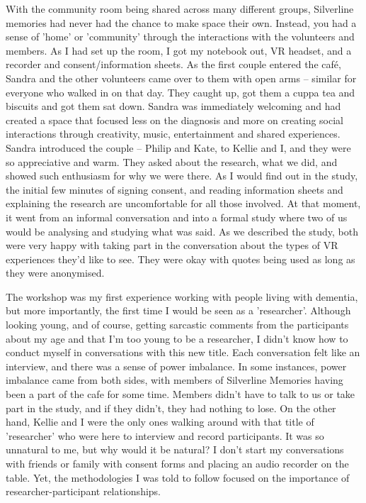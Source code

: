  With the community room being shared across many different groups, Silverline memories had never had the chance to make space their own. Instead, you had a sense of 'home' or 'community' through the interactions with the volunteers and members. As I had set up the room, I got my notebook out, VR headset, and a recorder and consent/information sheets. As the first couple entered the café, Sandra and the other volunteers came over to them with open arms – similar for everyone who walked in on that day. They caught up, got them a cuppa tea and biscuits and got them sat down. Sandra was immediately welcoming and had created a space that focused less on the diagnosis and more on creating social interactions through creativity, music, entertainment and shared experiences. Sandra introduced the couple – Philip and Kate, to Kellie and I, and they were so appreciative and warm. They asked about the research, what we did, and showed such enthusiasm for why we were there. As I would find out in the study, the initial few minutes of signing consent, and reading information sheets and explaining the research are uncomfortable for all those involved. At that moment, it went from an informal conversation and into a formal study where two of us would be analysing and studying what was said. As we described the study, both were very happy with taking part in the conversation about the types of VR experiences they'd like to see. They were okay with quotes being used as long as they were anonymised. 

The workshop was my first experience working with people living with dementia, but more importantly, the first time I would be seen as a 'researcher'. Although looking young, and of course, getting sarcastic comments from the participants about my age and that I'm too young to be a researcher, I didn't know how to conduct myself in conversations with this new title. Each conversation felt like an interview, and there was a sense of power imbalance.  In some instances, power imbalance came from both sides, with members of Silverline Memories having been a part of the cafe for some time. Members didn't have to talk to us or take part in the study, and if they didn't, they had nothing to lose. On the other hand, Kellie and I were the only ones walking around with that title of 'researcher' who were here to interview and record participants. It was so unnatural to me, but why would it be natural? I don't start my conversations with friends or family with consent forms and placing an audio recorder on the table. Yet, the methodologies I was told to follow focused on the importance of researcher-participant relationships. 
 
